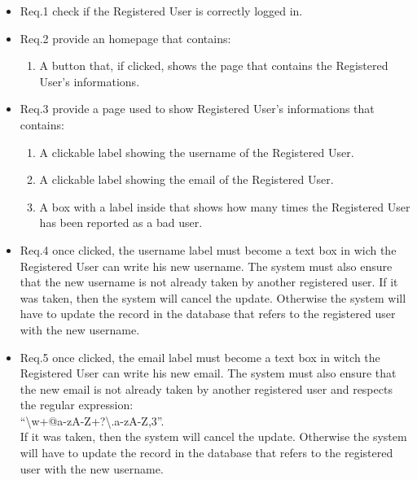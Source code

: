 				\begin{itemize}
					\item \lbrack Req.1\rbrack \label{sec:fr1_g5} check if the Registered User is correctly logged in.
					\item \lbrack Req.2\rbrack \label{sec:fr2_g5} provide an homepage that contains:
						\begin{enumerate}
							\item A button that, if clicked, shows the page that contains the Registered User's informations.
						\end{enumerate}
					\item \lbrack Req.3\rbrack \label{sec:fr3_g5} provide a page used to show Registered User's informations that contains:
						\begin{enumerate}
							\item A clickable label showing the username of the Registered User.
							\item A clickable label showing the email of the Registered User.
							\item A box with a label inside that shows how many times the Registered User has been reported as a bad user.
						\end{enumerate}
					\item \lbrack Req.4\rbrack \label{sec:fr4_g5} once clicked, the username label must become a text box in wich the Registered User can write his new username. The system must also ensure that the new username is not already taken by another registered user. If it was taken, then the system will cancel the update. Otherwise the system will have to update the record in the database that refers to the registered user with the new username.
					\item \lbrack Req.5\rbrack \label{sec:fr5_g5} once clicked, the email label must become a text box in witch the Registered User can write his new email. The system must also ensure that the new email is not already taken by another registered user and respects the regular expression:\\ \textquotedblleft\textbackslash w+@\lbrack a-zA-Z\textunderscore\rbrack +?\textbackslash .\lbrack a-zA-Z\rbrack{},3\textbraceright\textdollar\textquotedblright.\\ If it was taken, then the system will cancel the update. Otherwise the system will have to update the record in the database that refers to the registered user with the new username.
				\end{itemize}

